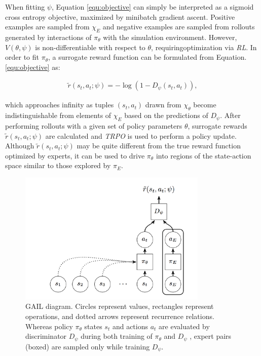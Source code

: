 When fitting $\psi$, Equation \ref{equ:objective} can simply be interpreted as a sigmoid cross entropy objective, maximized by minibatch gradient ascent. 
Positive examples are sampled from $\chi_E$ and negative examples are sampled from rollouts generated by interactions of $\pi_\theta$ with the simulation environment. 
However, $V(\theta,\psi)$ is non-differentiable with respect to $\theta$, requiringoptimization via {\it RL}.
In order to fit $\pi_\theta$, a surrogate reward function can be formulated from Equation. \ref{equ:objective} as:

\begin{eqnarray}
\tilde{r}(s_t,a_t;\psi)=-\log (1-D_{\psi}(s_t,a_t)) ,
\end{eqnarray}

which approaches infinity as tuples $(s_t,a_t)$ drawn from $\chi_\theta$ become indistinguishable from elements of $\chi_E$ based on the predictions of $D_\psi$. 
After performing rollouts with a given set of policy parameters $\theta$, surrogate rewards $\tilde{r}(s_t,a_t;\psi)$ are calculated and {\it TRPO} is used to perform a policy update.
Although $\tilde{r}(s_t,a_t;\psi)$ may be quite different from the true reward function optimized by experts, it can be used to drive $\pi_\theta$ into regions of the state-action space similar to those explored by $\pi_E$.


\begin{figure}[H]
\begin{center}
\includegraphics[width=9cm]{./figures/gail_diagram.png}
\caption{GAIL diagram. Circles represent values, rectangles represent operations, and dotted arrows represent recurrence relations. Whereas policy $\pi_\theta$ states $s_t$ and actions $a_t$ are evaluated by discriminator $D_\psi$ during both training of $\pi_\theta$ and $D_\psi$ , expert pairs (boxed) are sampled only while training $D_\psi$.}
\label{fig:gail_diagram}
\end{center}
\end{figure}
